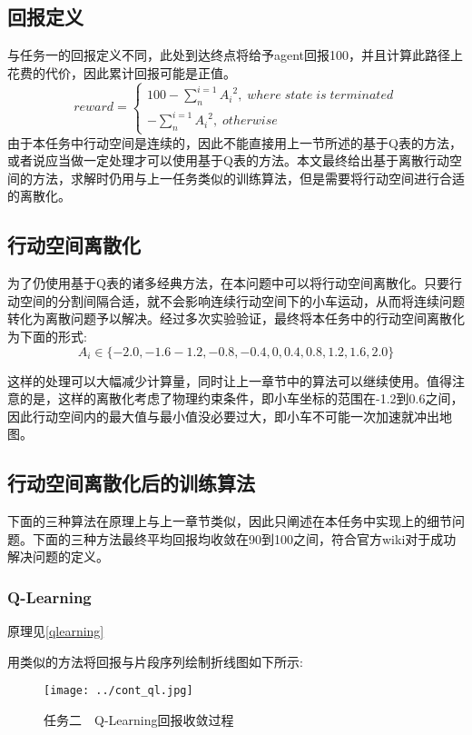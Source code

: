 \documentclass[UTF8]{ctexart}
\begin{document}
\subsection{回报定义}
与任务一的回报定义不同，此处到达终点将给予agent回报100，并且计算此路径上花费的代价，因此累计回报可能是正值。
\begin{equation}
    reward=\begin{cases}
        100-\sum_{n}^{i=1}{A_i}^2, \; where\; state\; is\; terminated\\
        -\sum_{n}^{i=1}{A_i}^2,\; otherwise
    \end{cases}
\end{equation}
由于本任务中行动空间是连续的，因此不能直接用上一节所述的基于Q表的方法，或者说应当做一定处理才可以使用基于Q表的方法。本文最终给出基于离散行动空间的方法，求解时仍用与上一任务类似的训练算法，但是需要将行动空间进行合适的离散化。

\subsection{行动空间离散化}

为了仍使用基于Q表的诸多经典方法，在本问题中可以将行动空间离散化。只要行动空间的分割间隔合适，就不会影响连续行动空间下的小车运动，从而将连续问题转化为离散问题予以解决。经过多次实验验证，最终将本任务中的行动空间离散化为下面的形式:
\begin{equation}
    A_i \in \{-2.0,-1.6-1.2,-0.8,-0.4,0,0.4,0.8,1.2,1.6,2.0\}
\end{equation}

这样的处理可以大幅减少计算量，同时让上一章节中的算法可以继续使用。值得注意的是，这样的离散化考虑了物理约束条件，即小车坐标的范围在-1.2到0.6之间，因此行动空间内的最大值与最小值没必要过大，即小车不可能一次加速就冲出地图。

\subsection{行动空间离散化后的训练算法}
下面的三种算法在原理上与上一章节类似，因此只阐述在本任务中实现上的细节问题。下面的三种方法最终平均回报均收敛在90到100之间，符合官方wiki对于成功解决问题的定义。
\subsubsection{Q-Learning}
原理见\ref{qlearning}

用类似的方法将回报与片段序列绘制折线图如下所示:
\begin{figure}[H]
    \centering
    \texttt{[image: ../cont\_ql.jpg]}
    \caption{任务二　Q-Learning回报收敛过程}
\end{figure}
\end{document}
